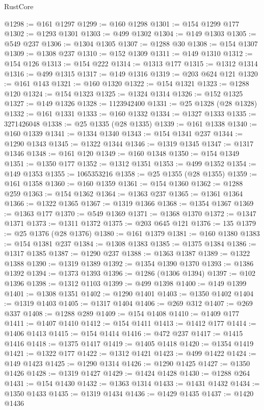 \begin{lexlean}{RustCore}
\begin{coremodule}
@1298 := @161 @1297
@1299 := @160 @1298
@1301 := @154 @1299 @177
@1302 := @1293 @1301
@1303 := @499 @1302
@1304 := @149 @1303
@1305 := @549 @237
@1306 := @1304 @1305
@1307 := @1288 @30
@1308 := @154 @1307
@1309 := @1308 @237
@1310 := @152 @1309
@1311 := @149 @1310
@1312 := @154 @126
@1313 := @154 @222
@1314 := @1313 @177
@1315 := @1312 @1314
@1316 := @499 @1315
@1317 := @149 @1316
@1319 := @203 @624 @121
@1320 := @161 @143
@1321 := @160 @1320
@1322 := @154 @1321
@1323 := @1288 @120
@1324 := @154 @1323
@1325 := @1324 @1314
@1326 := @152 @1325
@1327 := @149 @1326
@1328 := 1123942400
@1331 := @25 @1328 (@28 @1328)
@1332 := @161 @1331
@1333 := @160 @1332
@1334 := @1327 @1333
@1335 := 3271426048
@1338 := @25 @1335 (@28 @1335)
@1339 := @161 @1338
@1340 := @160 @1339
@1341 := @1334 @1340
@1343 := @154 @1341 @237
@1344 := @1290 @1343
@1345 := @1322 @1344
@1346 := @1319 @1345
@1347 := @1317 @1346
@1348 := @161 @120
@1349 := @160 @1348
@1350 := @154 @1349
@1351 := @1350 @177
@1352 := @1312 @1351
@1353 := @499 @1352
@1354 := @149 @1353
@1355 := 1065353216
@1358 := @25 @1355 (@28 @1355)
@1359 := @161 @1358
@1360 := @160 @1359
@1361 := @154 @1360
@1362 := @1288 @259
@1363 := @154 @1362
@1364 := @1363 @237
@1365 := @1361 @1364
@1366 := @1322 @1365
@1367 := @1319 @1366
@1368 := @1354 @1367
@1369 := @1363 @177
@1370 := @549 @1369
@1371 := @1368 @1370
@1372 := @1347 @1371
@1373 := @1311 @1372
@1375 := @203 @645 @121
@1376 := 135
@1379 := @25 @1376 (@28 @1376)
@1380 := @161 @1379
@1381 := @160 @1380
@1383 := @154 @1381 @237
@1384 := @1308 @1383
@1385 := @1375 @1384
@1386 := @1317 @1385
@1387 := @1290 @237
@1388 := @1363 @1387
@1389 := @1322 @1388
@1390 := @1319 @1389
@1392 := @1354 @1390 @1370
@1393 := @1386 @1392
@1394 := @1373 @1393
@1396 := @1286 (@1306 @1394)
@1397 := @102 @1396
@1398 := @1312 @1103
@1399 := @499 @1398
@1400 := @149 @1399
@1401 := @1308 @1351
@1402 := @1290 @1401
@1403 := @1350 @1402
@1404 := @1319 @1403
@1405 := @1317 @1404
@1406 := @269 @312
@1407 := @269 @337
@1408 := @1288 @289
@1409 := @154 @1408
@1410 := @1409 @177
@1411 := @1407 @1410
@1412 := @154 @1411
@1413 := @1412 @177
@1414 := @1406 @1413
@1415 := @154 @1414
@1416 := @472 @237
@1417 := @1415 @1416
@1418 := @1375 @1417
@1419 := @1405 @1418
@1420 := @1354 @1419
@1421 := @1322 @177
@1422 := @1312 @1421
@1423 := @499 @1422
@1424 := @149 @1423
@1425 := @1290 @1314
@1426 := @1290 @1425
@1427 := @1350 @1426
@1428 := @1319 @1427
@1429 := @1424 @1428
@1430 := @1288 @264
@1431 := @154 @1430
@1432 := @1363 @1314
@1433 := @1431 @1432
@1434 := @1350 @1433
@1435 := @1319 @1434
@1436 := @1429 @1435
@1437 := @1420 @1436

\end{coremodule}
\end{lexlean}
